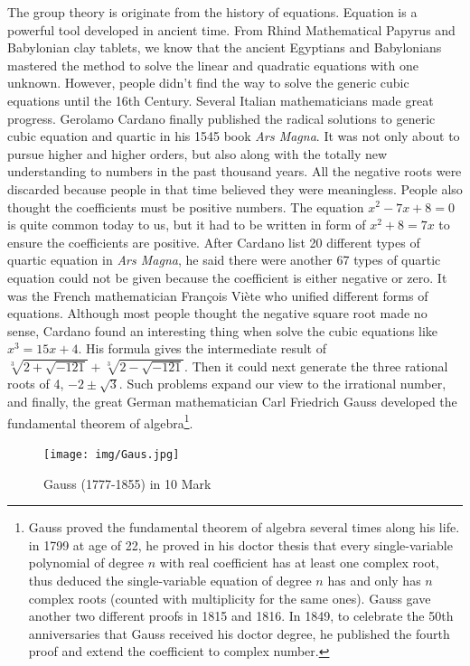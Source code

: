 \documentclass[b5paper]{article}
\begin{document}
The group theory is originate from the history of equations. Equation is a powerful tool developed in ancient time. From Rhind Mathematical Papyrus and Babylonian clay tablets, we know that the ancient Egyptians and Babylonians mastered the method to solve the linear and quadratic equations with one unknown. However, people didn't find the way to solve the generic cubic equations until the 16th Century. Several Italian mathematicians made great progress. Gerolamo Cardano finally published the radical solutions to generic cubic equation and quartic in his 1545 book {\em Ars Magna}. It was not only about to pursue higher and higher orders, but also along with the totally new understanding to numbers in the past thousand years. All the negative roots were discarded because people in that time believed they were meaningless. People also thought the coefficients must be positive numbers. The equation $x^2 - 7x + 8 = 0$ is quite common today to us, but it had to be written in form of $x^2 + 8 = 7x$ to ensure the coefficients are positive. After Cardano list 20 different types of quartic equation in {\em Ars Magna}, he said there were another 67 types of quartic equation could not be given because the coefficient is either negative or zero\cite{HanXueTao2012}. It was the French mathematician François Viète who unified different forms of equations. Although most people thought the negative square root made no sense, Cardano found an interesting thing when solve the cubic equations like $x^3 = 15x +4$. His formula gives the intermediate result of $\sqrt[3]{2 + \sqrt{-121}} + \sqrt[3]{2 - \sqrt{-121}}$. Then it could next generate the three rational roots of 4, $-2 \pm \sqrt{3}$. Such problems expand our view to the irrational number, and finally, the great German mathematician Carl Friedrich Gauss developed the fundamental theorem of algebra\footnote{Gauss proved the fundamental theorem of algebra several times along his life. in 1799 at age of 22, he proved in his doctor thesis that every single-variable polynomial of degree $n$ with real coefficient has at least one complex root, thus deduced the single-variable equation of degree $n$ has and only has $n$ complex roots (counted with multiplicity for the same ones). Gauss gave another two different proofs in 1815 and 1816. In 1849, to celebrate the 50th anniversaries that Gauss received his doctor degree, he published the fourth proof and extend the coefficient to complex number.}.

\begin{figure}[htbp]
 \centering
 \texttt{[image: img/Gaus.jpg]}
 \captionsetup{labelformat=empty}
 \caption{Gauss (1777-1855) in 10 Mark}
 \label{fig:Gauss}
\end{figure}
\end{document}
